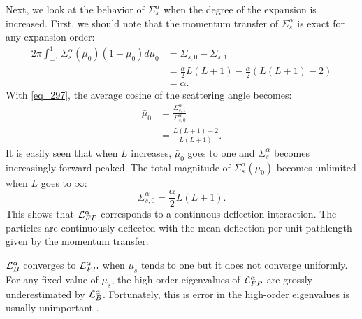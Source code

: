 Next, we look at the behavior of $\Sigma_s^{\alpha}$ when the degree of the expansion 
is increased. First, we should note that the momentum transfer of
$\Sigma_s^{\alpha}$ is exact for any expansion order:
\begin{equation}
\begin{split}
2\pi \int_{-1}^1 \Sigma_s^{\alpha}(\mu_0) (1-\mu_0) d\mu_0 &=
\Sigma_{s,0}-\Sigma_{s,1}\\
&=\frac{\alpha}{2} L(L+1) - \frac{\alpha}{2} (L(L+1)-2)\\
&=\alpha.
\end{split}
\end{equation}
With \cref{eq_297}, the average cosine of the scattering angle
becomes:
\begin{equation}
\begin{split}
\bar{\mu}_0 &= \frac{\Sigma_{s,1}^{\alpha}}{\Sigma_{s,0}^{\alpha}}\\
&=\frac{L(L+1)-2}{L(L+1)}.
\end{split}
\end{equation}
It is easily seen that when $L$ increases, $\bar{\mu}_0$ goes to one and
$\Sigma_s^{\alpha}$ becomes increasingly forward-peaked. The
total magnitude of $\Sigma_s^{\alpha}(\mu_0)$ becomes unlimited when $L$ goes to
$\infty$:
\begin{equation}
\Sigma_{s,0}^{\alpha} = \frac{\alpha}{2} L (L+1).
\end{equation}
This shows that $\mathcal{L}_{FP}^{\alpha}$ corresponds to a continuous-deflection 
interaction. The particles are continuously 
deflected with the mean deflection per unit pathlength given by the momentum transfer.

$\mathcal{L}_{B}^{\alpha}$ converges to $\mathcal{L}_{FP}^{\alpha}$ when $\mu_s$ tends
to one but it does not converge uniformly. For any fixed value of $\mu_s$, 
the high-order eigenvalues of $\mathcal{L}_{FP}^{\alpha}$ are grossly underestimated 
by $\mathcal{L}_B^{\alpha}$. Fortunately, this is error in the high-order eigenvalues 
is usually unimportant \cite{morel_96}.
